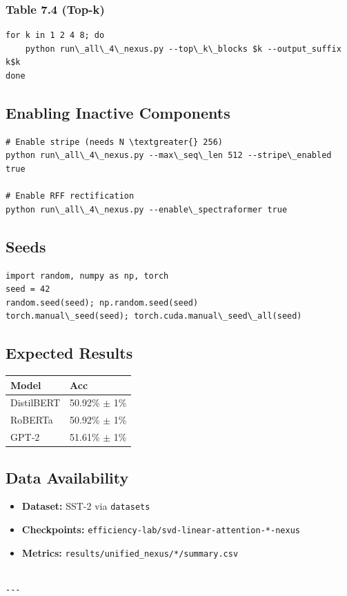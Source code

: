 \subsubsection{Table 7.4 (Top-k)}
\begin{lstlisting}
for k in 1 2 4 8; do
    python run\_all\_4\_nexus.py --top\_k\_blocks $k --output_suffix k$k
done
\end{lstlisting}

\subsection{Enabling Inactive Components}

\begin{lstlisting}
# Enable stripe (needs N \textgreater{} 256)
python run\_all\_4\_nexus.py --max\_seq\_len 512 --stripe\_enabled true

# Enable RFF rectification
python run\_all\_4\_nexus.py --enable\_spectraformer true
\end{lstlisting}

\subsection{Seeds}

\begin{lstlisting}
import random, numpy as np, torch
seed = 42
random.seed(seed); np.random.seed(seed)
torch.manual\_seed(seed); torch.cuda.manual\_seed\_all(seed)
\end{lstlisting}

\subsection{Expected Results}

\begin{table}[H]
\centering
\small
\begin{tabular}{ll}
\toprule
\textbf{Model} & \textbf{Acc} \\
\midrule
DistilBERT & 50.92\% $\pm$ 1\% \\
RoBERTa & 50.92\% $\pm$ 1\% \\
GPT-2 & 51.61\% $\pm$ 1\% \\
\bottomrule
\end{tabular}
\end{table}

\subsection{Data Availability}

\begin{itemize}
\item \textbf{Dataset:} SST-2 via \texttt{datasets}
\item \textbf{Checkpoints:} \texttt{efficiency-lab/svd-linear-attention-*-nexus}
\item \textbf{Metrics:} \texttt{results/unified\_nexus/*/summary.csv}
\end{itemize}
\begin{lstlisting}

---
\end{lstlisting}